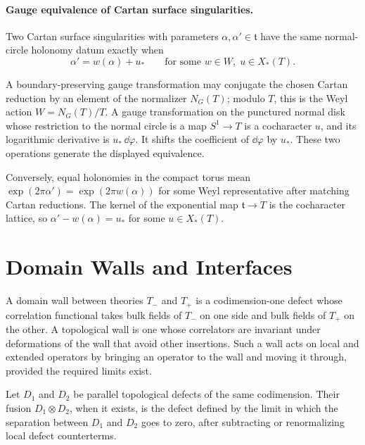 \paragraph{Gauge equivalence of Cartan surface singularities.}
Two Cartan surface singularities with parameters \(\alpha,\alpha'\in
\mathfrak t\) have the same normal-circle holonomy datum exactly when
\[
  \alpha'=w(\alpha)+u_*
  \qquad
  \text{for some }w\in W,\; u\in X_*(T).
\]

A boundary-preserving gauge transformation may conjugate the chosen Cartan
reduction by an element of the normalizer \(N_G(T)\); modulo \(T\), this is
the Weyl action \(W=N_G(T)/T\).  A gauge transformation on the punctured
normal disk whose restriction to the normal circle is a map \(S^1\to T\) is
a cocharacter \(u\), and its logarithmic derivative is
\(u_*\,\dd\varphi\).  It shifts the coefficient of \(\dd\varphi\) by
\(u_*\).  These two operations generate the displayed equivalence.

Conversely, equal holonomies in the compact torus mean
\(\exp(2\pi\alpha')=\exp(2\pi w(\alpha))\) for some Weyl representative after
matching Cartan reductions.  The kernel of the exponential map
\(\mathfrak t\to T\) is the cocharacter lattice, so
\(\alpha'-w(\alpha)=u_*\) for some \(u\in X_*(T)\).

\section{Domain Walls and Interfaces}

A domain wall between theories \(T_-\) and \(T_+\) is a codimension-one defect
whose correlation functional takes bulk fields of \(T_-\) on one side and
bulk fields of \(T_+\) on the other.  A topological wall is one whose
correlators are invariant under deformations of the wall that avoid other
insertions.  Such a wall acts on local and extended operators by bringing an
operator to the wall and moving it through, provided the required limits
exist.

\begin{definition}
\label{def:fusion-topological-defects}
Let \(D_1\) and \(D_2\) be parallel topological defects of the same
codimension.  Their fusion \(D_1\otimes D_2\), when it exists, is the defect
defined by the limit in which the separation between \(D_1\) and \(D_2\) goes
to zero, after subtracting or renormalizing local defect counterterms.
\end{definition}

